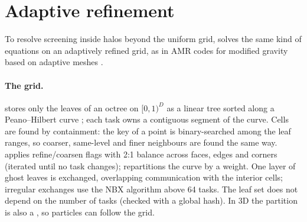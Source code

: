 \section{Adaptive refinement}\label{sec:mg-amr}

To resolve screening inside halos beyond the uniform grid,  solves the same kind of equations on an
adaptively refined grid, as in AMR codes for modified gravity \cite{Li2012ECOSMOG,Llinares2014,Puchwein2013} based on adaptive
meshes \cite{Kravtsov1997,Teyssier2002}.

\paragraph*{The grid.}  stores only the leaves of an octree on $[0,1)^D$ as a linear tree sorted along a
Peano--Hilbert curve \cite{Skilling2004}; each task owns a contiguous segment of the curve. Cells are found by containment:
the key of a point is binary-searched among the leaf ranges, so coarser, same-level and finer neighbours are found the same way.
 applies refine/coarsen flags with 2:1 balance across faces, edges and corners (iterated until no task changes);
 repartitions the curve by a weight. One layer of ghost leaves is exchanged, overlapping communication with
the interior cells; irregular exchanges use the NBX algorithm \cite{Hoefler2010} above 64 tasks. The leaf set does not depend
on the number of tasks (checked with a global hash). In 3D the partition is also a , so particles can
follow the grid.

